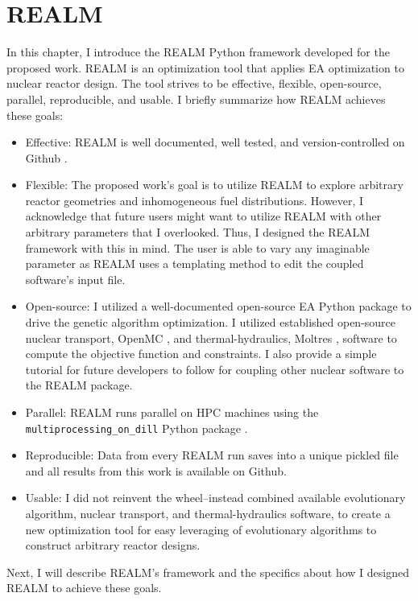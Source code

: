\chapter{REALM}

In this chapter, I introduce the \gls{REALM} Python framework developed for the
proposed work.
\gls{REALM} is an optimization tool that applies \gls{EA} optimization to 
nuclear reactor design. 
The tool strives to be effective, flexible, open-source, parallel, reproducible, 
and usable. 
I briefly summarize how \gls{REALM} achieves these goals:  
\begin{itemize}
    \item Effective: \gls{REALM} is well documented, well tested, and 
    version-controlled on Github \cite{chee_arfcrealm_2021}.
    \item Flexible: The proposed work's goal is to utilize \gls{REALM} to 
    explore arbitrary reactor geometries and inhomogeneous fuel distributions. 
    However, I acknowledge that future users might want to utilize \gls{REALM} 
    with other arbitrary parameters that I overlooked. Thus, I designed the \gls{REALM}
    framework with this in mind. The user is able to vary any imaginable parameter 
    as \gls{REALM} uses a templating method to edit the coupled software's input 
    file.
    \item Open-source: I utilized a well-documented open-source \gls{EA} Python 
    package to drive the genetic algorithm optimization. I utilized established 
    open-source nuclear transport, OpenMC \cite{romano_openmc_2013}, and 
    thermal-hydraulics, Moltres \cite{lindsay_introduction_2018}, software to 
    compute the objective function and constraints. I also provide a simple 
    tutorial for future developers to follow for coupling other nuclear software 
    to the \gls{REALM} package.  
    \item Parallel: \gls{REALM} runs parallel on \gls{HPC} machines using the 
    \texttt{multiprocessing\_on\_dill} Python package 
    \cite{smallshire_multiprocessing_on_dill_nodate}.
    \item Reproducible: Data from every REALM run saves into a unique pickled file
    and all results from this work is available on Github. 
    \item Usable: I did not reinvent the wheel--instead combined available 
    evolutionary algorithm, nuclear transport, and thermal-hydraulics software, 
    to create a new optimization tool for easy leveraging of evolutionary algorithms 
    to construct arbitrary reactor designs. 
\end{itemize}
Next, I will describe \gls{REALM}'s framework and the specifics about how 
I designed \gls{REALM} to achieve these goals. 

